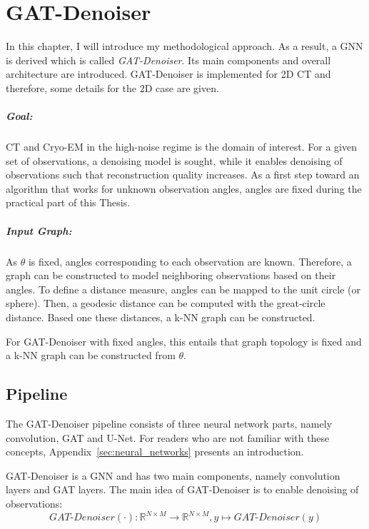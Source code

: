 \chapter{GAT-Denoiser}
\label{sec:contribution}

In this chapter, I will introduce my methodological approach.
As a result, a GNN is derived which is called \textit{GAT-Denoiser}.
Its main components and overall architecture are introduced.
GAT-Denoiser is implemented for 2D CT and therefore, some details for the 2D case are given.


\paragraph{Goal:}
CT and Cryo-EM in the high-noise regime is the domain of interest.
For a given set of observations, a denoising model is sought, while
it enables denoising of observations such that reconstruction quality increases.
As a first step toward an algorithm that works for unknown observation angles, 
angles are fixed during the practical part of this Thesis.


\paragraph{Input Graph:}
As $\theta$ is fixed, angles corresponding to each observation are known.
Therefore, a graph can be constructed to model neighboring observations 
based on their angles.
To define a distance measure, angles can be mapped to the unit circle (or sphere).
Then, a geodesic distance can be computed with the great-circle distance.
Based one these distances, a k-NN graph can be constructed.


\begin{tcolorbox}[colback=red!5!white,colframe=red!75!black]
  For GAT-Denoiser with fixed angles, this entails that graph topology is fixed and
  a k-NN graph can be constructed from $\theta$.
\end{tcolorbox}

\section{Pipeline}
\label{sec:concept}
The GAT-Denoiser pipeline consists of three neural network parts, namely convolution, GAT and U-Net.
For readers who are not familiar with these concepts, Appendix~\ref{sec:neural_networks} presents an introduction.

GAT-Denoiser is a GNN and has two main components, namely convolution layers and GAT layers.
The main idea of GAT-Denoiser is to enable denoising of observations:
\begin{equation}
  \textit{GAT-Denoiser} (\cdot) : \mathbb{R}^{N \times M} \to  \mathbb{R}^{N \times M} , y \mapsto \textit{GAT-Denoiser} (y) 
\end{equation}

